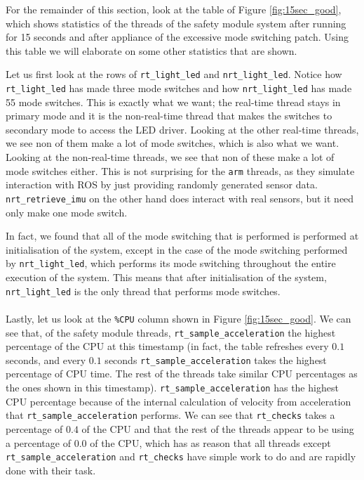 \documentclass[12pt]{scrreprt}
\begin{document}
For the remainder of this section, look at the table of Figure \ref{fig:15sec_good}, which shows statistics of the threads of the safety module system after running for 15 seconds and after appliance of the excessive mode switching patch. Using this table we will elaborate on some other statistics that are shown.  
\par
Let us first look at the rows of \texttt{rt\_light\_led} and \texttt{nrt\_light\_led}. Notice how \texttt{rt\_light\_led} has made three mode switches and how \texttt{nrt\_light\_led} has made 55 mode switches. This is exactly what we want; the real-time thread stays in primary mode and it is the non-real-time thread that makes the switches to secondary mode to access the LED driver. Looking at the other real-time threads, we see non of them make a lot of mode switches, which is also what we want. Looking at the non-real-time threads, we see that non of these make a lot of mode switches either. This is not surprising for the \texttt{arm} threads, as they simulate interaction with ROS by just providing randomly generated sensor data. \texttt{nrt\_retrieve\_imu} on the other hand does interact with real sensors, but it need only make one mode switch.
\par
In fact, we found that all of the mode switching that is performed is performed at initialisation of the system, except in the case of the mode switching performed by \texttt{nrt\_light\_led}, which performs its mode switching throughout the entire execution of the system. This means that after initialisation of the system, \texttt{nrt\_light\_led} is the only thread that performs mode switches.
\\\\
Lastly, let us look at the \texttt{\%CPU} column shown in Figure \ref{fig:15sec_good}. We can see that, of the safety module threads, \texttt{rt\_sample\_acceleration} the highest percentage of the CPU at this timestamp (in fact, the table refreshes every $0.1$ seconds, and every $0.1$ seconds \texttt{rt\_sample\_acceleration} takes the highest percentage of CPU time. The rest of the threads take similar CPU percentages as the ones shown in this timestamp). \texttt{rt\_sample\_acceleration} has the highest CPU percentage  because of the internal calculation of velocity from acceleration that \texttt{rt\_sample\_acceleration} performs. We can see that \texttt{rt\_checks} takes a percentage of $0.4$ of the CPU and that the rest of the threads appear to be using a percentage of $0.0$ of the CPU, which has as reason that all threads except \texttt{rt\_sample\_acceleration} and \texttt{rt\_checks} have simple work to do and are rapidly done with their task. 
\end{document}
